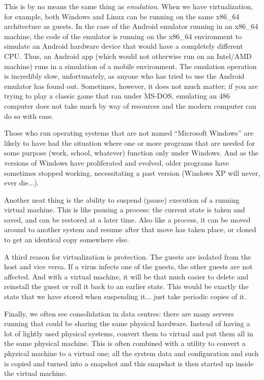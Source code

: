 This is by no means the same thing as \textit{emulation}. When we have virtualization, for example, both Windows and Linux can be running on the same x86\_64 architecture as guests. In the case of the Android emulator running in an x86\_64 machine, the code of the emulator is running on the x86\_64 environment to simulate an Android hardware device that would have a completely different CPU. Thus, an Android app (which would not otherwise run on an Intel/AMD machine) runs in a simulation of a mobile environment. The emulation operation is incredibly slow, unfortunately, as anyone who has tried to use the Android emulator has found out. Sometimes, however, it does not much matter; if you are trying to play a classic game that ran under MS-DOS, emulating an 486 computer does not take much by way of resources and the modern computer can do so with ease.

Those who run operating systems that are not named ``Microsoft Windows'' are likely to have had the situation where one or more programs that are needed for some purpose (work, school, whatever) function only under Windows. And as the versions of Windows have proliferated and evolved, older programs have sometimes stopped working, necessitating a past version (Windows XP will never, ever die...).

Another neat thing is the ability to suspend (pause) execution of a running virtual machine. This is like pausing a process: the current state is taken and saved, and can be restored at a later time. Also like a process, it can be moved around to another system and resume after that move has taken place, or cloned to get an identical copy somewhere else.

A third reason for virtualization is protection. The guests are isolated from the host and vice versa. If a virus infects one of the guests, the other guests are not affected. And with a virtual machine, it will be that much easier to delete and reinstall the guest or roll it back to an earlier state. This would be exactly the state that we have stored when suspending it... just take periodic copies of it.

Finally, we often see consolidation in data centres: there are many servers running that could be sharing the same physical hardware. Instead of having a lot of lightly used physical systems, convert them to virtual and put them all in the same physical machine. This is often combined with a utility to convert a physical machine to a virtual one; all the system data and configuration and such is copied and turned into a snapshot and this snapshot is then started up inside the virtual machine.

